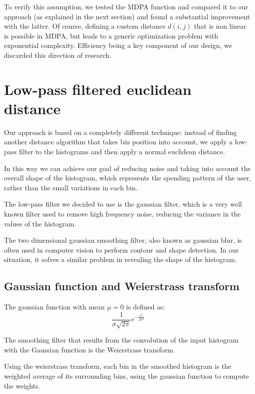 To verify this assumption, we tested the MDPA function and compared it to our approach (as explained in the next section) and found a substantial improvement with the latter. Of course, defining a custom distance $d(i, j)$ that is non linear is possible in MDPA, but leads to a generic optimization problem with exponential complexity. Efficiency being a key component of our design, we discarded this direction of research.

\section{Low-pass filtered euclidean distance}

Our approach is based on a completely different technique: instead of finding another distance algorithm that takes bin position into account, we apply a low-pass filter to the histograms and then apply a normal euclidean distance.

In this way we can achieve our goal of reducing noise and taking into account the overall shape of the histogram, which represents the spending pattern of the user, rather than the small variations in each bin. 

The low-pass filter we decided to use is the gaussian filter, which is a very well known filter used to remove high frequency noise, reducing the variance in the values of the histogram.

The two dimensional gaussian smoothing filter, also known as gaussian blur, is often used in computer vision to perform contour and shape detection. In our situation, it solves a similar problem in revealing the shape of the histogram.

\subsection{Gaussian function and Weierstrass transform}

The gaussian function with mean $\mu = 0$ is defined as:
\begin{displaymath}
  \frac{1}{\sigma\sqrt{2\pi}}e^{-\frac{x^2}{2\sigma^2}}
\end{displaymath}

The smoothing filter that results from the convolution of the input histogram with the Gaussian function is the Weierstrass transform.

Using the weierstrass transform, each bin in the smoothed histogram is the weighted average of its surrounding bins, using the gaussian function to compute the weights.

